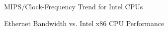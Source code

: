 \fi

\begin{figure}[tbp]
\centering
{}
\caption{MIPS/Clock-Frequency Trend for Intel CPUs}
\label{fig:SMPdesign:Clock-Frequency Trend for Intel CPUs}
\end{figure}

\begin{figure}[tbp]
\centering
{}
\caption{Ethernet Bandwidth vs. Intel x86 CPU Performance}
\label{fig:SMPdesign:Ethernet Bandwidth vs. Intel x86 CPU Performance}
\end{figure}

